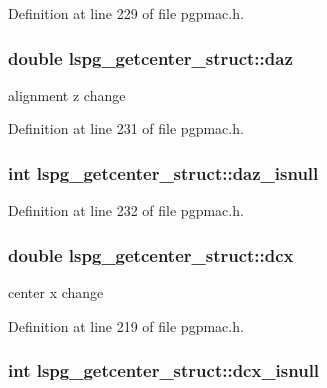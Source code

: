 Definition at line 229 of file pgpmac.\-h.

\hypertarget{structlspg__getcenter__struct_a1170bab2161f03ab29c39f79519ed9ae}{
\subsubsection[{daz}]{\setlength{\rightskip}{0pt plus 5cm}double lspg\-\_\-getcenter\-\_\-struct\-::daz}}\label{structlspg__getcenter__struct_a1170bab2161f03ab29c39f79519ed9ae}


alignment z change 



Definition at line 231 of file pgpmac.\-h.

\hypertarget{structlspg__getcenter__struct_a36742b6bd0f4bf9356414930ba893617}{
\subsubsection[{daz\-\_\-isnull}]{\setlength{\rightskip}{0pt plus 5cm}int lspg\-\_\-getcenter\-\_\-struct\-::daz\-\_\-isnull}}\label{structlspg__getcenter__struct_a36742b6bd0f4bf9356414930ba893617}


Definition at line 232 of file pgpmac.\-h.

\hypertarget{structlspg__getcenter__struct_ade0534056296e9ed568404c538be9227}{
\subsubsection[{dcx}]{\setlength{\rightskip}{0pt plus 5cm}double lspg\-\_\-getcenter\-\_\-struct\-::dcx}}\label{structlspg__getcenter__struct_ade0534056296e9ed568404c538be9227}


center x change 



Definition at line 219 of file pgpmac.\-h.

\hypertarget{structlspg__getcenter__struct_aa404da85af654998f039c81a77626748}{
\subsubsection[{dcx\-\_\-isnull}]{\setlength{\rightskip}{0pt plus 5cm}int lspg\-\_\-getcenter\-\_\-struct\-::dcx\-\_\-isnull}}\label{structlspg__getcenter__struct_aa404da85af654998f039c81a77626748}


